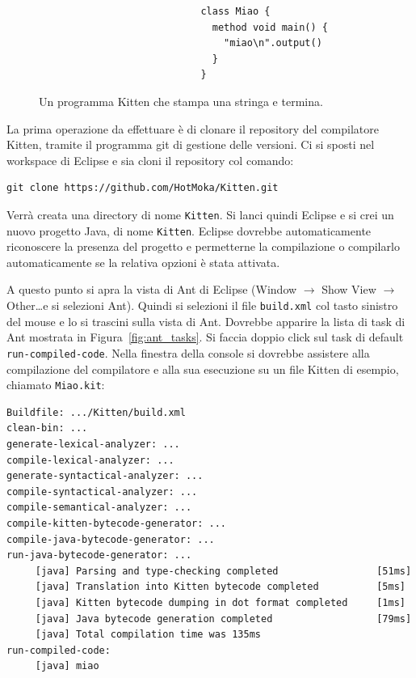 \begin{figure}[t]
\begin{verbatim}
                            class Miao {
                              method void main() {
                                "miao\n".output()
                              }
                            }
\end{verbatim}
\caption{Un programma Kitten che stampa una stringa e termina.}
  \label{fig:miao}
\end{figure}

La prima operazione da effettuare \`e di clonare il repository del compilatore Kitten,
tramite il programma git di gestione delle versioni. Ci si sposti nel workspace
di Eclipse e sia cloni il repository col comando:
%
\begin{verbatim}
git clone https://github.com/HotMoka/Kitten.git
\end{verbatim}
%
Verr\`a creata una directory di nome \texttt{Kitten}.
Si lanci quindi Eclipse e si crei un nuovo progetto Java,
di nome \texttt{Kitten}. Eclipse dovrebbe automaticamente riconoscere la presenza del progetto
e permetterne la compilazione o compilarlo automaticamente se la relativa opzioni \`e stata
attivata.


\noindent
A questo punto si apra la vista di Ant di Eclipse
(Window $\rightarrow$ Show View $\rightarrow$ Other\ldots e si selezioni Ant).
Quindi si selezioni il file \texttt{build.xml} col tasto sinistro del mouse e lo si trascini
sulla vista di Ant. Dovrebbe apparire la lista di task di Ant mostrata in Figura~\ref{fig:ant_tasks}.
Si faccia doppio click sul task di default \texttt{run-compiled-code}. Nella finestra della console
si dovrebbe assistere alla compilazione del compilatore e alla sua esecuzione su un file
Kitten di esempio, chiamato \texttt{Miao.kit}:

\begin{verbatim}
Buildfile: .../Kitten/build.xml
clean-bin: ...
generate-lexical-analyzer: ...
compile-lexical-analyzer: ...
generate-syntactical-analyzer: ...
compile-syntactical-analyzer: ...
compile-semantical-analyzer: ...
compile-kitten-bytecode-generator: ...
compile-java-bytecode-generator: ...
run-java-bytecode-generator: ...
     [java] Parsing and type-checking completed                 [51ms]
     [java] Translation into Kitten bytecode completed          [5ms]
     [java] Kitten bytecode dumping in dot format completed     [1ms]
     [java] Java bytecode generation completed                  [79ms]
     [java] Total compilation time was 135ms
run-compiled-code:
     [java] miao
\end{verbatim}

